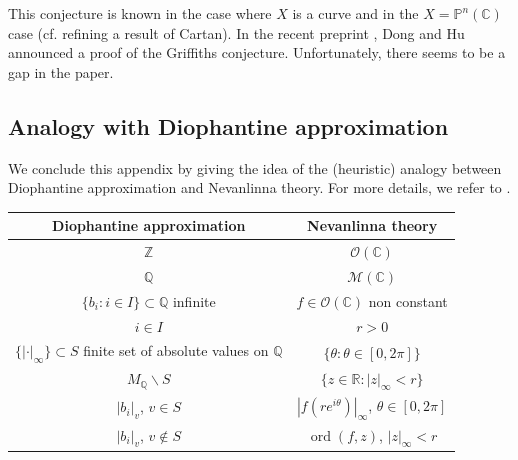 \documentclass [11pt,reqno]{amsart}
\def\bC{{\mathbb{C}}}
\def\bP{{\mathbb{P}}}
\def\bQ{{\mathbb{Q}}}
\def\bR{{\mathbb{R}}}
\def\bZ{{\mathbb{Z}}}
\newcommand{\1}{\mathmybb{1}}
\def\cM{{\mathcal{M}}}
\def\cO{{\mathcal{O}}}
\def\ord{\operatorname{ord}}
\def\setminus{\smallsetminus}
\newcommand{\va}{|\cdot|}
\begin{document}
This conjecture is known in the case where $X$ is a curve and in the $X = \bP^{n}(\bC)$ case (cf. \cite{Vojta97} refining a result of Cartan). In the recent preprint \cite{DongHu22}, Dong and Hu announced a proof of the Griffiths conjecture. Unfortunately, there seems to be a gap in the paper. 

\subsection{Analogy with Diophantine approximation}

We conclude this appendix by giving the idea of the (heuristic) analogy between Diophantine approximation and Nevanlinna theory. For more details, we refer to \cite{Vojta87,BombieriGubler,Vojta10}.

\begin{center}
\begin{tabular}{|c|c|}
  \hline  
  Diophantine approximation & Nevanlinna theory \\
  \hline 
  $\bZ$ & $\cO(\bC)$\\  
  \hline 
  $\bQ$ &  $\cM(\bC)$\\  
  \hline
  $\{b_i : i\in I\} \subset \bQ$ infinite & $f\in \cO(\bC)$ non constant\\
  \hline
  $i\in I$ & $r>0$ \\
  \hline
  $\{\va_{\infty}\}\subset S$ finite set of absolute values on $\bQ$ & $\{\theta : \theta \in [0,2\pi]\}$ \\
  \hline 
  $M_{\bQ} \setminus S$ & $\{z\in \bR : |z|_{\infty} < r\}$\\
  \hline
  $|b_i|_{v}$, $v\in S$  & $|f(re^{i\theta})|_{\infty}$, $\theta \in [0,2\pi]$\\
  \hline
  $|b_i|_{v}$, $v\notin S$ & $\ord(f,z)$, $|z|_{\infty} < r$\\
  \hline 
   \end{tabular}
  

\end{center}
\end{document}
